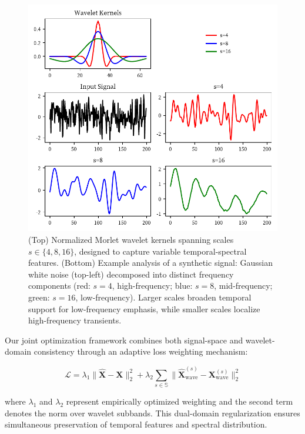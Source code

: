\documentclass[conference]{IEEEtran}
\begin{document}
\begin{figure}[tb]
    \centering
    \includegraphics[width=\linewidth]{wavelet-transform.pdf}
    \caption{(Top) Normalized Morlet wavelet kernels spanning scales \( s \in \{4, 8, 16\} \), designed to capture variable temporal-spectral features. (Bottom) Example analysis of a synthetic signal: Gaussian white noise (top-left) decomposed into distinct frequency components (red: \( s=4 \), high-frequency; blue: \( s=8 \), mid-frequency; green: \( s=16 \), low-frequency). Larger scales broaden temporal support for low-frequency emphasis, while smaller scales localize high-frequency transients.
    }

    \label{fig:wavelet-transform}
\end{figure}

Our joint optimization framework combines both signal-space and wavelet-domain consistency through an adaptive loss weighting mechanism:

\begin{equation}
    \mathcal{L} = \lambda_1\|\mathbf{\hat{X}} - \mathbf{X}\|_{2}^2 + \lambda_2\sum_{s\in\mathbb{S}} \|\mathbf{\hat{X}}_{\text{wave}}^{(s)} - \mathbf{X}_{\text{wave}}^{(s)}\|_{2}^2
\end{equation}

where $\lambda_1$ and $\lambda_2$ represent empirically optimized weighting and the second term denotes the norm over wavelet subbands. This dual-domain regularization ensures simultaneous preservation of  temporal features and spectral distribution.
\end{document}
